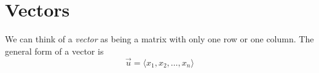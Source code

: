 \section{Vectors}\label{vectors}
We can think of a \emph{vector} as being a matrix with only one row or one
column. The general form of a vector is 
\begin{equation*}
    \vec{u} = \langle x_1, x_2, \hdots, x_n \rangle
\end{equation*}
